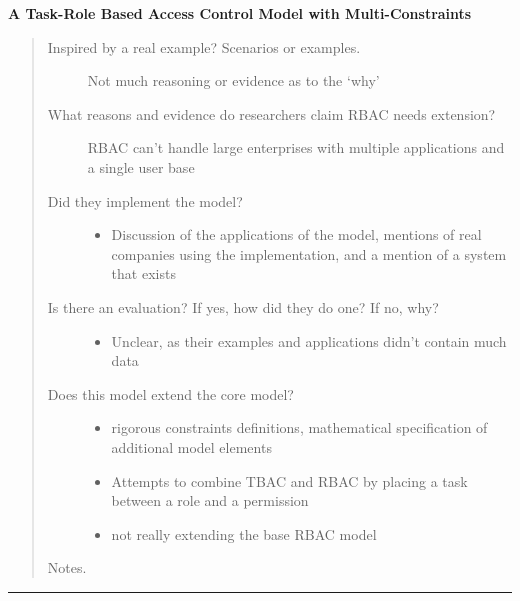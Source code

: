 \documentclass[letterpaper,10pt,english]{sphinxmanual}
\begin{document}
\textbf{A Task-Role Based Access Control Model with Multi-Constraints}
\begin{quote}
\begin{description}
\item[{Inspired by a real example? Scenarios or examples.}] \leavevmode
Not much reasoning or evidence as to the `why'

\item[{What reasons and evidence do researchers claim RBAC needs extension?}] \leavevmode
RBAC can't handle large enterprises with multiple applications and a single user base

\item[{Did they implement the model?}] \leavevmode\begin{itemize}
\item {} 
Discussion of the applications of the model, mentions of real companies using the implementation, and a mention of a system that exists

\end{itemize}

\item[{Is there an evaluation? If yes, how did they do one? If no, why?}] \leavevmode\begin{itemize}
\item {} 
Unclear, as their examples and applications didn't contain much data

\end{itemize}

\item[{Does this model extend the core model?}] \leavevmode\begin{itemize}
\item {} 
rigorous constraints definitions, mathematical specification of additional model elements

\item {} 
Attempts to combine TBAC and RBAC by placing a task between a role and a permission

\item {} 
not really extending the base RBAC model

\end{itemize}

\end{description}

Notes.
\end{quote}


\bigskip\hrule{}\bigskip
\end{document}
